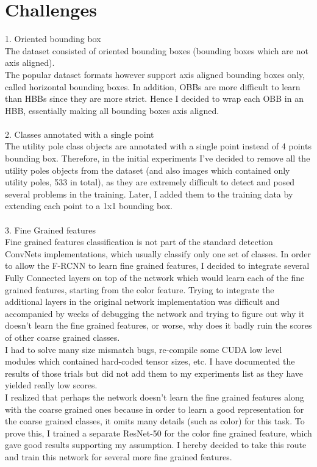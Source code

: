 \documentclass[]{article}
\begin{document}
\section{Challenges}
1. Oriented bounding box \\
The dataset consisted of oriented bounding boxes (bounding boxes which are not axis aligned). \\
The popular dataset formats however support axis aligned bounding boxes only, called horizontal bounding boxes. 
In addition, OBBs are more difficult to learn than HBBs since they are more strict. Hence I decided to wrap each OBB in an HBB, essentially making all bounding boxes axis aligned.  
\\\\
2. Classes annotated with a single point\\
The utility pole class objects are annotated with a single point instead of 4 points bounding box. Therefore, in the initial experiments I've decided to remove all the utility poles objects from the dataset (and also images which contained only utility poles, 533 in total), as they are extremely difficult to detect and posed several problems in the training. Later, I added them to the training data by extending each point to a 1x1 bounding box.
\\\\
3. Fine Grained features\\
Fine grained features classification is not part of the standard detection ConvNets implementations, which usually classify only one set of classes.
In order to allow the F-RCNN \cite{fasterrcnn} to learn fine grained features, I decided to integrate several Fully Connected layers on top of the network which would learn each of the fine grained features, starting from the color feature.
Trying to integrate the additional layers in the original network implementation was difficult and accompanied by weeks of debugging the network and trying to figure out why it doesn't learn the fine grained features, or worse, why does it badly ruin the scores of other coarse grained classes.\\
I had to solve many size mismatch bugs, re-compile some CUDA low level modules which contained hard-coded tensor sizes, etc.
I have documented the results of those trials but did not add them to my experiments list as they have yielded really low scores.\\
I realized that perhaps the network doesn't learn the fine grained features along with the coarse grained ones because in order to learn a good representation for the coarse grained classes, it omits many details (such as color) for this task. To prove this, I trained a separate ResNet-50 \cite{resnet} for the color fine grained feature, which gave good results supporting my assumption. I hereby decided to take this route and train this network for several more fine grained features.
\end{document}
